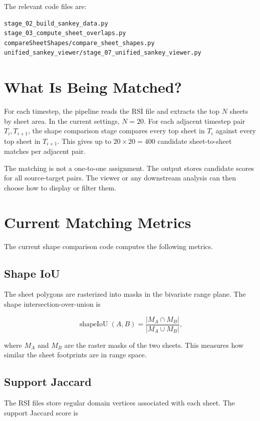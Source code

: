 \documentclass[11pt]{article}
\begin{document}
The relevant code files are:

\begin{verbatim}
stage_02_build_sankey_data.py
stage_03_compute_sheet_overlaps.py
compareSheetShapes/compare_sheet_shapes.py
unified_sankey_viewer/stage_07_unified_sankey_viewer.py
\end{verbatim}

\section{What Is Being Matched?}

For each timestep, the pipeline reads the RSI file and extracts the top
\(N\) sheets by sheet area. In the current settings, \(N=20\). For each
adjacent timestep pair \(T_i,T_{i+1}\), the shape comparison stage compares
every top sheet in \(T_i\) against every top sheet in \(T_{i+1}\). This gives up
to \(20 \times 20 = 400\) candidate sheet-to-sheet matches per adjacent pair.

The matching is not a one-to-one assignment. The output stores candidate scores
for all source-target pairs. The viewer or any downstream analysis can then
choose how to display or filter them.

\section{Current Matching Metrics}

The current shape comparison code computes the following metrics.

\subsection{Shape IoU}

The sheet polygons are rasterized into masks in the bivariate range plane. The
shape intersection-over-union is

\[
\operatorname{shapeIoU}(A,B)
=
\frac{|M_A \cap M_B|}{|M_A \cup M_B|},
\]

where \(M_A\) and \(M_B\) are the raster masks of the two sheets. This measures
how similar the sheet footprints are in range space.

\subsection{Support Jaccard}

The RSI files store regular domain vertices associated with each sheet. The
support Jaccard score is
\end{document}
